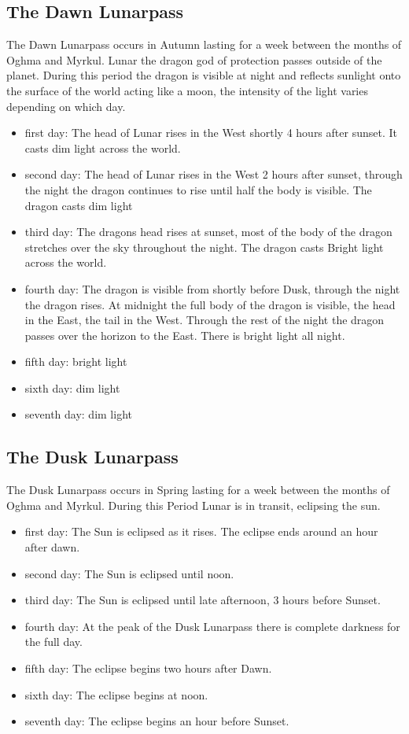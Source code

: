 \documentclass[10pt,twoside,twocolumn,openany,justified,bg=full,nomultitoc]{dndbook}
\begin{document}
\subsection{The Dawn Lunarpass}
\label{sec-1-1-2}
The Dawn Lunarpass occurs in Autumn lasting for a week between the months of Oghma and Myrkul. Lunar the dragon god of protection passes outside of the planet. During this period the dragon is visible at night and reflects sunlight onto the surface of the world acting like a moon, the intensity of the light varies depending on which day. 
\begin{itemize}
\item first day: The head of Lunar rises in the West shortly 4 hours after sunset. It casts dim light across the world.
\item second day:  The head of Lunar rises in the West 2 hours after sunset, through the night the dragon continues to rise until half the body is visible. The dragon casts dim light
\item third day: The dragons head rises at sunset, most of the body of the dragon stretches over the sky throughout the night. The dragon casts Bright light across the world.
\item fourth day: The dragon is visible from shortly before Dusk, through the night the dragon rises. At midnight the full body of the dragon is visible, the head in the East, the tail in the West. Through the rest of the night the dragon passes over the horizon to the East. There is bright light all night.
\item fifth day: bright light
\item sixth day: dim light
\item seventh day: dim light
\end{itemize}

\subsection{The Dusk Lunarpass}
\label{sec-1-1-3}
The Dusk Lunarpass occurs in Spring lasting for a week between the months of Oghma and Myrkul. During this Period Lunar is in transit, eclipsing the sun. 
\begin{itemize}
\item first day: The Sun is eclipsed as it rises. The eclipse ends around an hour after dawn.
\item second day: The Sun is eclipsed until noon.
\item third day: The Sun is eclipsed until late afternoon, 3 hours before Sunset.
\item fourth day: At the peak of the Dusk Lunarpass there is complete darkness for the full day.
\item fifth day: The eclipse begins two hours after Dawn.
\item sixth day: The eclipse begins at noon.
\item seventh day: The eclipse begins an hour before Sunset.
\end{itemize}
\end{document}

